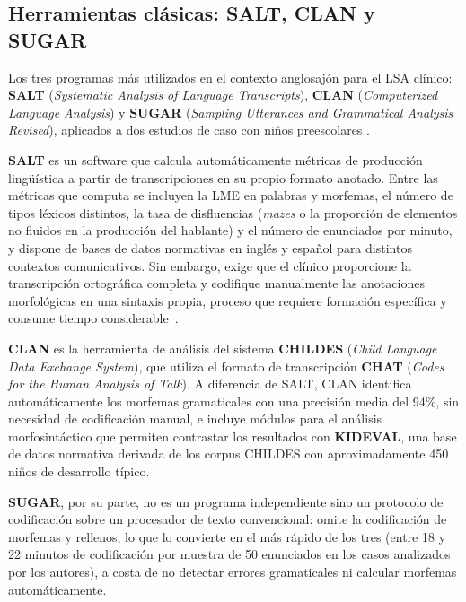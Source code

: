 \subsection{Herramientas clásicas: SALT, CLAN y SUGAR}
\label{subsec:salt_clan}

Los tres programas más utilizados en el contexto anglosajón para el LSA clínico: \textbf{\ac{SALT}}
(\emph{Systematic Analysis of Language Transcripts}), \textbf{\ac{CLAN}} (\emph{Computerized Language
Analysis}) y \textbf{\ac{SUGAR}} (\emph{Sampling Utterances and Grammatical Analysis Revised}),
aplicados a dos estudios de caso con niños preescolares \cite{lsa_computer_programs}.

\textbf{\ac{SALT}} es un software que calcula automáticamente métricas de producción lingüística a
partir de transcripciones en su propio formato anotado. Entre las métricas que computa
se incluyen la \ac{LME} en palabras y morfemas, el número de tipos léxicos distintos, la
tasa de disfluencias (\emph{mazes} o la proporción de elementos no fluidos en la producción 
del hablante) y el número de enunciados por minuto, y dispone de bases de datos normativas 
en inglés y español para distintos contextos comunicativos. Sin embargo, exige que el clínico 
proporcione la transcripción ortográfica completa y codifique manualmente las anotaciones 
morfológicas en una sintaxis propia, proceso que requiere formación específica y consume tiempo 
considerable~\cite{lsa_morphological_auto}.

\textbf{\ac{CLAN}} es la herramienta de análisis del sistema \textbf{\ac{CHILDES}} (\emph{Child Language Data
Exchange System}), que utiliza el formato de transcripción \textbf{\ac{CHAT}} (\emph{Codes for the
Human Analysis of Talk}). A diferencia de \ac{SALT}, \ac{CLAN} identifica automáticamente los
morfemas gramaticales con una precisión media del 94\%, sin necesidad de codificación
manual, e incluye módulos para el análisis morfosintáctico que permiten contrastar los resultados 
con \textbf{\ac{KIDEVAL}}, una base de datos normativa derivada de los corpus CHILDES con aproximadamente 
450 niños de desarrollo típico. 

\textbf{\ac{SUGAR}}, por su parte, no es un programa independiente sino un protocolo de codificación 
sobre un procesador de texto convencional: omite la codificación de morfemas y rellenos, lo que lo 
convierte en el más rápido de los tres (entre 18 y 22 minutos de codificación por muestra de 50 enunciados 
en los casos analizados por los autores), a costa de no detectar errores gramaticales ni calcular 
morfemas automáticamente.

